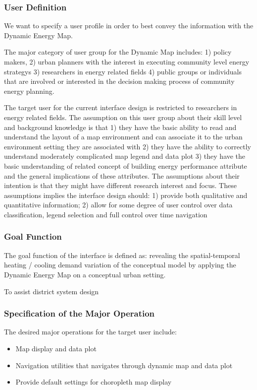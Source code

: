 \documentclass[hidelinks,12pt]{article}
\begin{document}
\subsubsection{User Definition}
We want to specify a user profile in order to best convey the
information with the Dynamic Energy Map.

The major category of user group for the Dynamic Map includes: 1)
policy makers, 2) urban planners with the interest in executing
community level energy strategys 3) researchers in energy related
fields 4) public groups or individuals that are involved or interested
in the decision making process of community energy planning.

The target user for the current interface design is restricted to
researchers in energy related fields. The assumption on this user
group about their skill level and background knowledge is that 1) they
have the basic ability to read and understand the layout of a map
environment and can associate it to the urban environment setting they
are associated with 2) they have the ability to correctly understand
moderately complicated map legend and data plot 3) they have the basic
understanding of related concept of building energy performance
attribute and the general implications of these attributes. The
assumptions about their intention is that they might have different
research interest and focus. These assumptions implies the interface
design should: 1) provide both qualitative and quantitative
information; 2) allow for some degree of user control over data
classification, legend selection and full control over time navigation

\subsubsection{Goal Function}
The goal function of the interface is defined as: revealing the
spatial-temporal heating / cooling demand variation of the conceptual
model by applying the Dynamic Energy Map on a conceptual urban
setting.

To assist district system design

\subsubsection{Specification of the Major Operation}

The desired major operations for the target user include: 
\begin{itemize}
\item Map display and data plot
\item Navigation utilities that navigates through dynamic map and data
  plot
\item Provide default settings for choropleth map display
\end{itemize}
\end{document}
